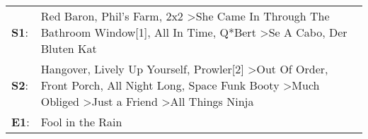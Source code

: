 \begin{supertabular}{p{0.03\textwidth}p{0.92\textwidth}}
 \textbf{S1}:  &                                                                                                             Red Baron\textsuperscript{}, \enspace Phil's Farm\textsuperscript{}, \enspace 2x2\textsuperscript{} \textgreater \enspace She Came In Through The Bathroom Window[1]\textsuperscript{}, \enspace All In Time\textsuperscript{}, \enspace Q*Bert\textsuperscript{} \textgreater \enspace Se A Cabo\textsuperscript{}, \enspace Der Bluten Kat\textsuperscript{}  \enspace  \\
 \textbf{S2}:  &  Hangover\textsuperscript{}, \enspace Lively Up Yourself\textsuperscript{}, \enspace Prowler[2]\textsuperscript{} \textgreater \enspace Out Of Order\textsuperscript{}, \enspace Front Porch\textsuperscript{}, \enspace All Night Long\textsuperscript{}, \enspace Space Funk Booty\textsuperscript{} \textgreater \enspace Much Obliged\textsuperscript{} \textgreater \enspace Just a Friend\textsuperscript{} \textgreater \enspace All Things Ninja\textsuperscript{}  \enspace  \\
 \textbf{E1}:  &                                                                                                                                                                                                                                                                                                                                                                                                                                         Fool in the Rain\textsuperscript{}  \enspace  \\
\end{supertabular}
